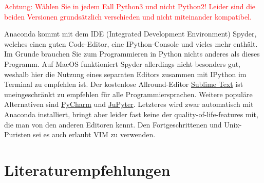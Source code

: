 \textcolor{red}{Achtung: W\"ahlen Sie in jedem Fall Python3 und nicht Python2! Leider sind die beiden Versionen grunds\"atzlich verschieden und nicht miteinander kompatibel.}

Anaconda kommt mit dem IDE (Integrated Development Environment) Spyder, welches einen guten Code-Editor, eine IPython-Console und vieles mehr enth\"alt. 
Im Grunde brauchen Sie zum Programmieren in Python nichts anderes als dieses Programm.
Auf MacOS funktioniert Spyder allerdings nicht besonders gut, weshalb hier die Nutzung eines separaten Editors zusammen mit IPython im Terminal zu empfehlen ist. 
Der kostenlose Allround-Editor \href{https://www.sublimetext.com/download}{Sublime Text} ist uneingeschr\"ankt zu empfehlen f\"ur alle Programmiersprachen.
Weitere popul\"are Alternativen sind \href{https://www.jetbrains.com/de-de/pycharm/download/}{PyCharm} und \href{https://jupyter.org}{JuPyter}. 
Letzteres wird zwar automatisch mit Anaconda installiert, bringt aber leider fast keine der quality-of-life-features mit, die man von den anderen Editoren kennt. 
Den Fortgeschrittenen und Unix-Puristen sei es auch erlaubt VIM zu verwenden.



\section{Literaturempfehlungen}

